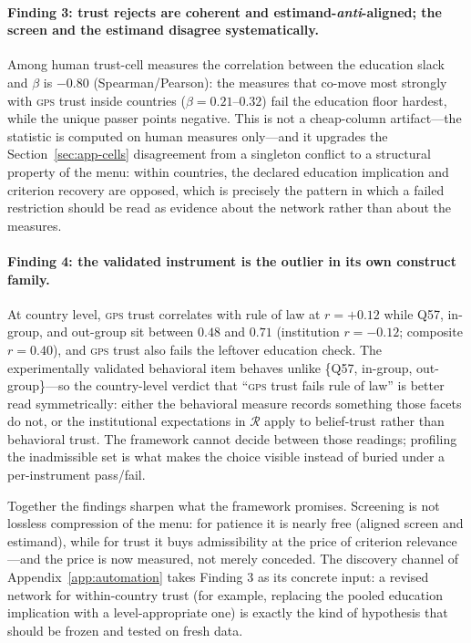 \documentclass[10pt,letterpaper]{article}
\newcommand{\GPS}{\textsc{gps}}
\newcommand{\Rset}{\mathcal{R}}
\begin{document}
\paragraph{Finding 3: trust rejects are coherent and estimand-\emph{anti}-aligned; the screen and the estimand disagree systematically.}
Among human trust-cell measures the correlation between the education slack and $\beta$ is $-0.80$ (Spearman/Pearson): the measures that co-move most strongly with \GPS{} trust inside countries ($\beta=0.21$--$0.32$) fail the education floor hardest, while the unique passer points negative.
This is not a cheap-column artifact---the statistic is computed on human measures only---and it upgrades the Section~\ref{sec:app-cells} disagreement from a singleton conflict to a structural property of the menu: within countries, the declared education implication and criterion recovery are opposed, which is precisely the pattern in which a failed restriction should be read as evidence about the network rather than about the measures.

\paragraph{Finding 4: the validated instrument is the outlier in its own construct family.}
At country level, \GPS{} trust correlates with rule of law at $r=+0.12$ while Q57, in-group, and out-group sit between $0.48$ and $0.71$ (institution $r=-0.12$; composite $r=0.40$), and \GPS{} trust also fails the leftover education check.
The experimentally validated behavioral item behaves unlike \{Q57, in-group, out-group\}---so the country-level verdict that ``\GPS{} trust fails rule of law'' is better read symmetrically: either the behavioral measure records something those facets do not, or the institutional expectations in $\Rset$ apply to belief-trust rather than behavioral trust.
The framework cannot decide between those readings; profiling the inadmissible set is what makes the choice visible instead of buried under a per-instrument pass/fail.

\medskip
\noindent
Together the findings sharpen what the framework promises.
Screening is not lossless compression of the menu: for patience it is nearly free (aligned screen and estimand), while for trust it buys admissibility at the price of criterion relevance---and the price is now measured, not merely conceded.
The discovery channel of Appendix~\ref{app:automation} takes Finding 3 as its concrete input: a revised network for within-country trust (for example, replacing the pooled education implication with a level-appropriate one) is exactly the kind of hypothesis that should be frozen and tested on fresh data.
\end{document}

